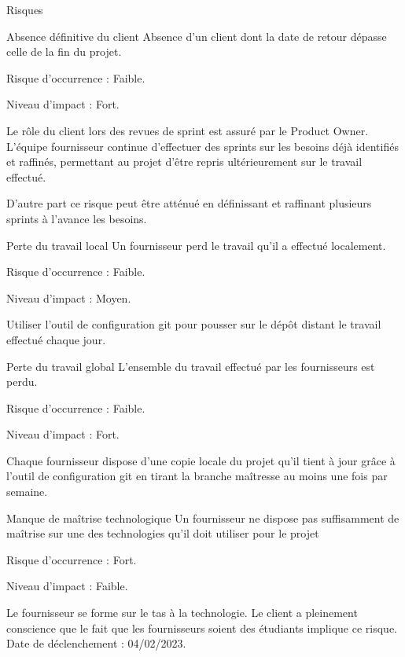 \documentclass[]{article}
\begin{document}
{\begin{section}{Risques}
 \newpage

 \begin{subsection}{Absence définitive du client}
     Absence d'un client dont la date de retour dépasse celle de la fin du projet.

     Risque d’occurrence : Faible.

     Niveau d’impact : Fort.

     Le rôle du client lors des revues de sprint est assuré par le Product Owner. L'équipe fournisseur continue d'effectuer des sprints sur les besoins déjà identifiés et raffinés, permettant au projet d'être repris ultérieurement sur le travail effectué.

     D'autre part ce risque peut être atténué en définissant et raffinant plusieurs sprints à l'avance les besoins.
 \end{subsection}

 \begin{subsection}{Perte du travail local}
     Un fournisseur perd le travail qu'il a effectué localement.

     Risque d’occurrence : Faible.

     Niveau d’impact : Moyen.

     Utiliser l'outil de configuration git pour pousser sur le dépôt distant le travail effectué chaque jour.
 \end{subsection}

 \begin{subsection}{Perte du travail global}
     L'ensemble du travail effectué par les fournisseurs est perdu.

     Risque d’occurrence : Faible.

     Niveau d’impact : Fort.

     Chaque fournisseur dispose d'une copie locale du projet qu'il tient à jour grâce à l'outil de configuration git en tirant la branche maîtresse au moins une fois par semaine.
 \end{subsection}

 \newpage

 \begin{subsection}{Manque de maîtrise technologique}
     Un fournisseur ne dispose pas suffisamment de maîtrise sur une des technologies qu'il doit utiliser pour le projet

     Risque d’occurrence : Fort.

     Niveau d’impact : Faible.

     Le fournisseur se forme sur le tas à la technologie. Le client a pleinement conscience que le fait que les fournisseurs soient des étudiants implique ce risque.
     \\[5mm]
     Date de déclenchement : 04/02/2023.


\end{subsection}
\end{section}}
\end{document}
